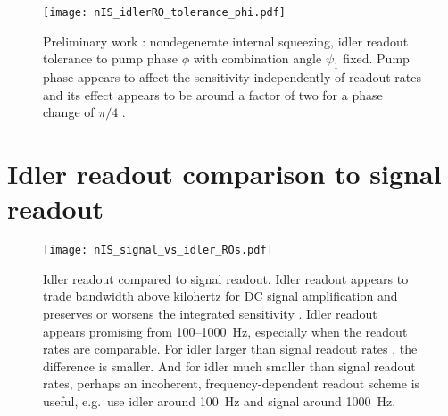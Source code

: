 \begin{figure}
	\centering
	\texttt{[image: nIS\_idlerRO\_tolerance\_phi.pdf]}
	\caption{  Preliminary work : nondegenerate internal squeezing, idler readout tolerance to pump phase $\phi$ with combination angle $\psi_1$ fixed.   Pump phase appears to affect the sensitivity independently of readout rates and its effect appears to be around a factor of two for a phase change of $\pi/4$ .}
	\label{fig:}
\end{figure}



\section{Idler readout comparison to signal readout}



\begin{figure}
	\centering
	\texttt{[image: nIS\_signal\_vs\_idler\_ROs.pdf]}
	\caption{  Idler readout compared to signal readout. Idler readout appears to trade bandwidth above kilohertz for DC signal amplification and preserves or worsens the integrated sensitivity . Idler readout appears promising from 100--1000~Hz, especially when the readout rates are comparable. For idler larger than signal readout rates , the difference is smaller. And for idler much smaller than signal readout rates, perhaps an incoherent, frequency-dependent readout scheme is useful, e.g.\ use idler around 100~Hz and signal around 1000~Hz. }
	\label{fig:}
\end{figure}

